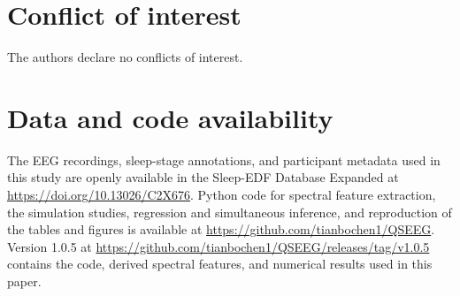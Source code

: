 \section*{Conflict of interest}
The authors declare no conflicts of interest.

\section*{Data and code availability}
The EEG recordings, sleep-stage annotations, and participant metadata used in this study are openly available in the Sleep-EDF Database Expanded at \url{https://doi.org/10.13026/C2X676}. Python code for spectral feature extraction, the simulation studies, regression and simultaneous inference, and reproduction of the tables and figures is available at \url{https://github.com/tianbochen1/QSEEG}. Version 1.0.5 at \url{https://github.com/tianbochen1/QSEEG/releases/tag/v1.0.5} contains the code, derived spectral features, and numerical results used in this paper.

\FloatBarrier
